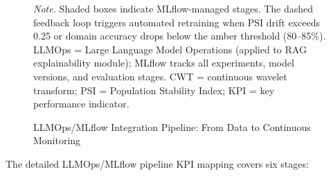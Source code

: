 \begin{figure}[!htbp]
{%
}
\caption[LLMOps/MLflow Integration Pipeline (Appendix)]{LLMOps/MLflow Integration Pipeline: From Data to Continuous Monitoring}
\label{fig:llmops_pipeline}
\vspace{0.3em}\noindent\textit{Note.} Shaded boxes indicate MLflow-managed stages. The dashed feedback loop triggers automated retraining when PSI drift exceeds 0.25 or domain accuracy drops below the amber threshold (80--85\%). LLMOps = Large Language Model Operations (applied to RAG explainability module); MLflow tracks all experiments, model versions, and evaluation stages. CWT = continuous wavelet transform; PSI = Population Stability Index; KPI = key performance indicator.
\end{figure}

The detailed LLMOps/MLflow pipeline KPI mapping covers six stages:

